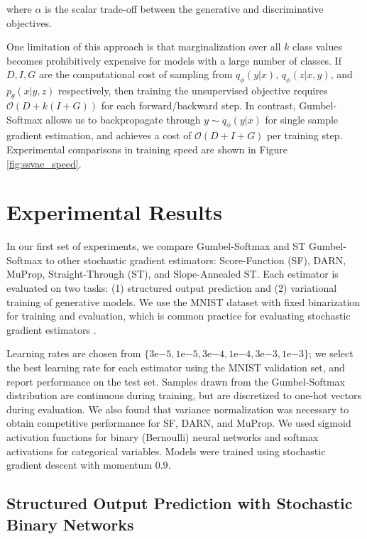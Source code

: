 \documentclass{article} %
\begin{document}
where $\alpha$ is the scalar trade-off between the generative and discriminative objectives.



One limitation of this approach is that marginalization over all $k$ class values becomes prohibitively expensive for models with a large number of classes. If $D,I,G$ are the computational cost of sampling from $q_\phi(y|x)$, $q_\phi(z|x,y)$, and $p_\theta(x|y,z)$ respectively, then training the unsupervised objective requires $\mathcal{O}(D+k(I+G))$ for each forward/backward step. In contrast, Gumbel-Softmax allows us to backpropagate through $y \sim q_\phi(y|x)$ for single sample gradient estimation, and achieves a cost of $\mathcal{O}(D+I+G)$ per training step. Experimental comparisons in training speed are shown in Figure \ref{fig:ssvae_speed}.


\section{Experimental Results}

In our first set of experiments, we compare Gumbel-Softmax and ST Gumbel-Softmax to other stochastic gradient estimators: Score-Function (SF), DARN, MuProp, Straight-Through (ST), and Slope-Annealed ST. Each estimator is evaluated on two tasks: (1) structured output prediction and (2) variational training of generative models. We use the MNIST dataset with fixed binarization for training and evaluation, which is common practice for evaluating stochastic gradient estimators \citep{SalMurray08,larochelle2011}. 

Learning rates are chosen from $\{3\mathrm{e}{-5},1\mathrm{e}{-5},3\mathrm{e}{-4},1\mathrm{e}{-4},3\mathrm{e}{-3},1\mathrm{e}{-3}\}$; we select the best learning rate for each estimator using the MNIST validation set, and report performance on the test set. Samples drawn from the Gumbel-Softmax distribution are continuous during training, but are discretized to one-hot vectors during evaluation. We also found that variance normalization was necessary to obtain competitive performance for SF, DARN, and MuProp. We used sigmoid activation functions for binary (Bernoulli) neural networks and softmax activations for categorical variables. Models were trained using stochastic gradient descent with momentum $0.9$. 

\subsection{Structured Output Prediction with Stochastic Binary Networks}
\end{document}
